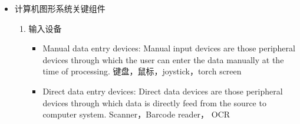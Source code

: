 \documentclass[UTF8]{ctexart}
\begin{document}
\begin{itemize}
\begin{enumerate}
\begin{itemize}
                \item Flight simulator
                \item Simulators for practice sessions.
                \item simulators of military tanks.
            \end{itemize}
            \item Image Processing
            \begin{itemize}
                \item CT scans.
                \item PS,PR application to improve the quality of a picture.
            \end{itemize}
            \item Graphical User Interface GUI
            \begin{itemize}
                \item Clickable buttons.
                \item Dialog box is to display additional information for users.
                \item Icon is a small symbol.
                \item Menu is a list of commands or choices.
            \end{itemize}
            \item Visualization
            \begin{itemize}
                \item Producing graphical representations for scientific, engineering datasets.
                \item Business visualization.
            \end{itemize}
        \end{enumerate}
    \item 计算机图形系统关键组件
    \begin{enumerate}
        \item 输入设备
        \begin{itemize}
            \item Manual data entry devices: Manual input devices are those peripheral devices through which the user can enter the data manually at the time of processing. 键盘，鼠标，joystick，torch screen
            \item Direct data entry devices: Direct data devices are those peripheral devices through which data is directly feed from the source to computer system. Scanner，Barcode reader， OCR 
        \end{itemize}

\end{enumerate}
\end{itemize}
\end{document}
